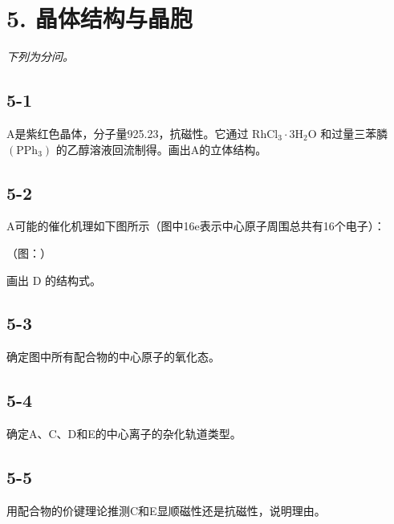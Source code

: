 \section*{5. 晶体结构与晶胞}
\textit{下列为分问。}

\subsection*{5-1}
A是紫红⾊晶体，分⼦量925.23，抗磁性。它通过 $\mathrm { R h C l _ { 3 } } { \cdot } 3 \mathrm { H _ { 2 } O }$ 和过量三苯膦 $\left( \mathrm { P P h } _ { 3 } \right)$ 的⼄醇溶液回流制得。画出A的⽴体结构。

\subsection*{5-2}
A可能的催化机理如下图所⽰（图中16e表⽰中⼼原⼦周围总共有16个电⼦）：

（图：）

画出 D 的结构式。

\subsection*{5-3}
确定图中所有配合物的中⼼原⼦的氧化态。

\subsection*{5-4}
确定A、C、D和E的中⼼离⼦的杂化轨道类型。

\subsection*{5-5}
⽤配合物的价键理论推测C和E显顺磁性还是抗磁性，说明理由。
